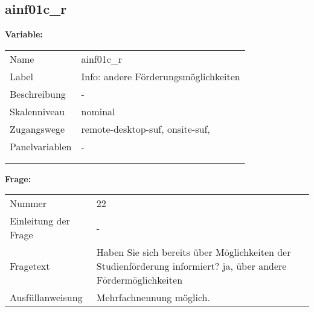 	
	
	\subsection{ainf01c\_r}
	\label{subSection:ainf01c_r}

	\noindent\textbf{Variable:}\\
		\begin{tabular}{lL{11.3cm}}
			\label{tableVariable:ainf01c_r}
			Name & ainf01c\_r \\
			Label & Info: andere Förderungsmöglichkeiten \\
			Beschreibung & - \\
			Skalenniveau & nominal \\
			Zugangswege &
				remote-desktop-suf,
				onsite-suf,
 \\
			Panelvariablen & -
			 \\
			 \\
 \\
		\end{tabular}

		\vspace*{1 cm}
		\noindent\textbf{Frage:}\\
		\begin{tabular}{lL{11.3cm}}
			\label{tableQuestion:ainf01c_r}
			Nummer & 22 \\
			Einleitung der Frage & - \\
			Fragetext & Haben Sie sich bereits über Möglichkeiten der Studienförderung informiert?
ja, über andere Fördermöglichkeiten \\
			Ausfüllanweisung & Mehrfachnennung möglich. \\
		\end{tabular}





